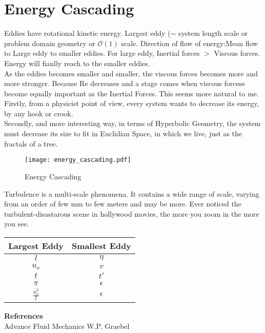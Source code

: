 \documentclass{book}
\begin{document}
\section{Energy Cascading}
 Eddies have rotational kinetic energy. Largest eddy ($\sim$ system length scale or problem domain geometry or $\mathcal{O}(1) $ scale. Direction of flow of energy:Mean flow to Large eddy to smaller eddies.  For large eddy, Inertial forces $>$ Viscous forces. Energy will fianlly reach to the smaller eddies. \\
As the eddies becomes smaller and smaller, the viscous forces becomes more and more stronger. Because Re decreases and a stage comes when viscous forcess become equally important as the Inertial Forces. This seems more natural to me. Firstly, from a physicist point of view, every system wants to decrease its energy, by any hook or crook.\\
Secondly, and more interesting way, in terms of Hyperbolic Geometry, the system must decrease its size to fit in Euclidian Space, in which we live, just as the fractals of a tree. \\
\begin{center}
\begin{figure}[h]
\texttt{[image: energy\_cascading.pdf]}
\caption{Energy Cascading}
\end{figure}
\end{center}
Turbulence is a multi-scale phenomena. It contains a wide range of scale, varying from an order of few mm to few meters and may be more. Ever noticed the turbulent-disastarous scene in hollywood movies, the more you zoom in \textemdash the more you see.
\begin{center}
\begin{tabular}{||c c||} 
 \hline
Largest Eddy & Smallest Eddy\\ [0.5ex] 
 \hline\hline
 $l$ & $\eta$  \\ 
 \hline
 $u_o$ & $v$  \\
 \hline
 $t$ & $t\prime$ \\
 \hline
 $\pi$ & $\epsilon$  \\
 \hline
 $\frac{u_o^3}{l}$ & $\epsilon$  \\ [1ex] 
 \hline
\end{tabular}
\end{center}
\vspace{5cm}
\textbf{References} \textemdash \\

Advance Fluid Mechanics \textemdash W.P. Graebel
\end{document}
